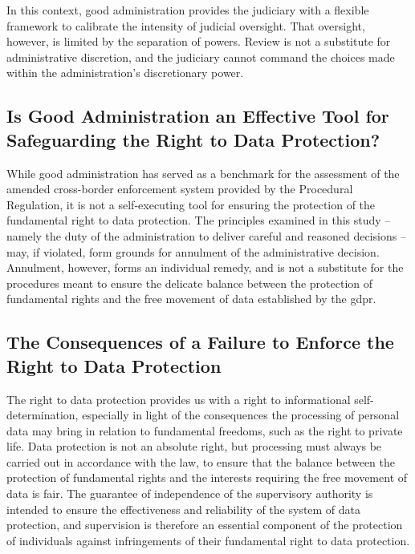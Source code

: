 In this context, good administration provides the judiciary with a flexible framework to calibrate the intensity of judicial oversight.\autocite[102]{hofmannDutyCareEU2020}
That oversight, however, is limited by the separation of powers.\autocite[4]{mendesDiscretionCarePublic2016}
Review is not a substitute for administrative discretion, and the judiciary cannot command the choices made within the administration's discretionary power.\autocite[4]{mendesDiscretionCarePublic2016}

\subsection{Is Good Administration an Effective Tool for Safeguarding the Right to Data Protection?}
\label{sec:ch6-good-administration-effective}
While good administration has served as a benchmark for the assessment of the amended cross-border enforcement system provided by the Procedural Regulation, it is not a self-executing tool for ensuring the protection of the fundamental right to data protection.
The principles examined in this study -- namely the duty of the administration to deliver careful and reasoned decisions -- may, if violated, form grounds for annulment of the administrative decision.\autocites[29]{TUM}[78]{Sytraval}
Annulment, however, forms an individual remedy, and is not a substitute for the procedures meant to ensure the delicate balance between the protection of fundamental rights and the free movement of data established by the \gls{gdpr}.

\subsection{The Consequences of a Failure to Enforce the Right to Data Protection}
\label{sec:ch6-consequences-failure}

The right to data protection provides us with a right to informational self-determination, especially in light of the consequences the processing of personal data may bring in relation to fundamental freedoms, such as the right to private life.\autocites[68]{ÖsterreichischerRundfunk}[7]{CFR}[8]{echr}
Data protection is not an absolute right,\autocite[recital 4]{GDPR} but processing must always be carried out in accordance with the law,\autocite[8(2)]{CFR} to ensure that the balance between the protection of fundamental rights and the interests requiring the free movement of data is fair.\autocite[42]{SchremsI}
The guarantee of independence of the supervisory authority is intended to ensure the effectiveness and reliability of the system of data protection, and supervision is therefore an essential component of the protection of individuals against infringements of their fundamental right to data protection.\autocite[41]{SchremsI}

